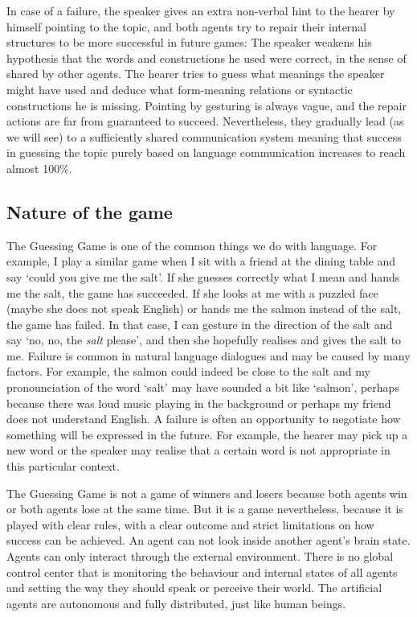 In case of a failure, the speaker gives an extra non-verbal
hint to the hearer by himself pointing to the topic, 
and both agents try to repair
their internal structures to be more successful in future
games: The speaker weakens his hypothesis that the words
and constructions he used 
were correct, in the sense of shared by other agents. 
The hearer tries to guess what meanings the speaker 
might have used and deduce what form-meaning relations or 
syntactic constructions he is missing. Pointing by gesturing is
always vague, and the repair actions are far from guaranteed to succeed. 
Nevertheless, they gradually lead (as we will see) to 
a sufficiently shared communication system meaning that 
success in guessing the topic purely based on language
communication increases to reach almost 100\%. 

\subsection{Nature of the game}

The Guessing Game is one of the common things we do with language. 
For example, I play a similar game when I sit with a friend
at the dining table and say `could you give me the salt'. 
If she guesses correctly what I mean and hands 
me the salt, the game has succeeded. If she looks at me 
with a puzzled face (maybe she does not speak English) or hands me
the salmon instead of the salt, the game has failed. In that case, 
I can gesture in the direction of the salt and say `no, no, the {\itshape salt}
please', and then she hopefully realises and gives the salt to me. Failure 
is common in natural language dialogues and may be caused by 
many factors. For example, the salmon could indeed 
be close to the salt and my pronounciation of the word `salt'
may have sounded a bit like `salmon', perhaps because there was
loud music playing in the background or perhaps
my friend does not understand English. 
A failure is often 
an opportunity to negotiate how something will be expressed
in the future. For example, the hearer may pick up a new word
or the speaker may realise that a certain word is 
not appropriate in this particular context. 

The Guessing Game is not a game of winners and losers because both 
agents win or both agents lose at the same time. But it is a game
nevertheless, because it is played with clear rules, 
with a clear outcome and strict limitations on how 
success can be achieved. An agent can not look inside another
agent's brain state. Agents can only interact through the 
external environment. There is no global control 
center that is monitoring the behaviour and internal states
of all agents and setting the way they should speak or 
perceive their world. The artificial agents are autonomous and
fully distributed, just like human beings. 

